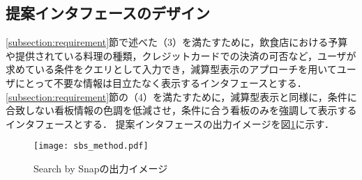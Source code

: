   \subsection{提案インタフェースのデザイン}
    \ref{subsection:requirement}節で述べた（3）を満たすために，飲食店における予算や提供されている料理の種類，クレジットカードでの決済の可否など，ユーザが求めている条件をクエリとして入力でき，減算型表示のアプローチを用いてユーザにとって不要な情報は目立たなく表示するインタフェースとする．
    \ref{subsection:requirement}節の（4）を満たすために，減算型表示と同様に，条件に合致しない看板情報の色調を低減させ，条件に合う看板のみを強調して表示するインタフェースとする．
    提案インタフェースの出力イメージを図\ref{figure:sbs_method}に示す．
  \begin{figure}[tb]
    \centerline{\texttt{[image: sbs\_method.pdf]}}
    \caption{Search by Snapの出力イメージ}
    \label{figure:sbs_method}
  \end{figure}
